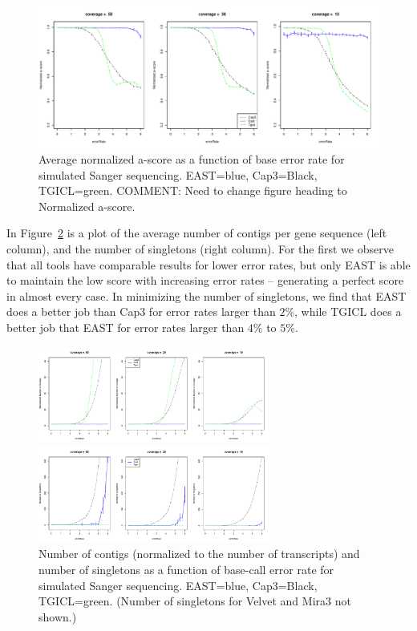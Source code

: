 \documentclass[10pt]{bmc_article}
\newcommand{\capthree} {{\small Cap3}}
\newcommand{\tgicl} {{\small TGICL}}
\newcommand{\east} {{\small EAST}}
\newcommand{\velvet}{{\small Velvet}}
\newcommand{\mira}{{\small Mira3}}
\newenvironment{bmcformat}{\begin{raggedright}\baselineskip20pt\sloppy\setboolean{publ}{false}}{\end{raggedright}\baselineskip20pt\sloppy}
\begin{document}
\begin{bmcformat}
\begin{figure}[htb]
\centerline{\includegraphics[width=6in]{pics.d/ascore_sanger_norm.pdf}}
\caption{Average normalized a-score as a function of base error rate for
  simulated Sanger sequencing.  \east=blue, \capthree=Black,
  \tgicl=green. COMMENT: Need to change figure heading to Normalized a-score.}
\label{sangerAscore}
\end{figure}

In Figure~\ref{contigsSanger} is a
plot of the average number of contigs per gene sequence (left column), and
the number of singletons (right column).  For the first we observe that all tools have
comparable results for lower error rates, but only \east\/ is able to
maintain the low score with increasing error rates -- generating a
perfect score in almost every case.  In minimizing the
number of singletons, we find that \east\/ does a better job than
\capthree\/ for error rates larger than $2\%$, while \tgicl\/ does a
better job that \east\/ for error rates larger than $4\%$ to $5\%$.

\begin{figure}[htb]
\begin{minipage}{3in}
\includegraphics[width=3in]{pics.d/numContigs_sanger.pdf}
\end{minipage}
\begin{minipage}{3in}
\includegraphics[width=3in]{pics.d/numSingle_sanger.pdf}
\end{minipage}
\caption{Number of contigs (normalized to the number of transcripts)
  and number of singletons as a function of base-call error
  rate for simulated Sanger sequencing.  \east=blue, \capthree=Black,
  \tgicl=green.  (Number of singletons for
  \velvet\/ and \mira\/ not shown.)}
\label{contigsSanger}
\end{figure}



\end{bmcformat}
\end{document}
